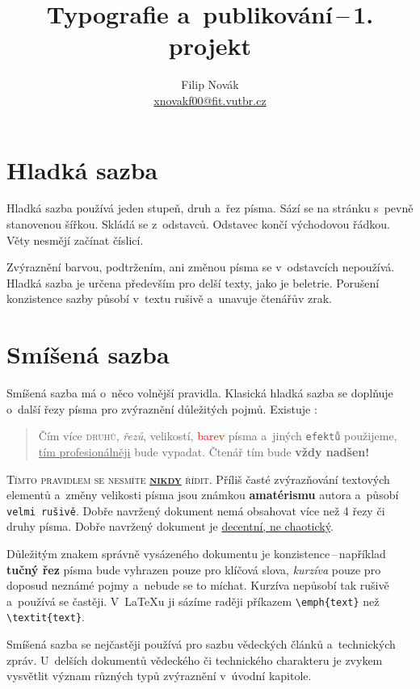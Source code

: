 \documentclass[twocolumn, a4paper]{article}
\title{Typografie a~publikování\,--\,1. projekt}
\date{}
\author{Filip Novák\\ \href{mailto: xnovakf00@fit.vutbr.cz}{xnovakf00@fit.vutbr.cz}}
\begin{document}
\maketitle

\section{\textbf{Hladká sazba}}
Hladká sazba používá jeden stupeň, druh a~řez písma.
Sází se na stránku s~pevně stanovenou šířkou.
Skládá se z~odstavců. Odstavec končí východovou řádkou.
Věty nesmějí začínat číslicí.

Zvýraznění barvou, podtržením, ani změnou písma se v~odstavcích nepoužívá.
Hladká sazba je určena především pro delší texty, jako je beletrie.
Porušení konzistence sazby působí v~textu rušivě a~unavuje čtenářův zrak.

\section{\textbf{Smíšená sazba}}\label{2}
Smíšená sazba má o~něco volnější pravidla.
Klasická hladká sazba se doplňuje o~další řezy písma pro zvýraznění důležitých pojmů.
Existuje :
\begin{quotation}
Čím více \textsc{druhů}, \emph{řezů}, {\scriptsize velikostí}, \textcolor{red}{barev} písma a~jiných \texttt{efektů} použijeme, \underline{tím profesionálněji} bude {\selectfont{dokument}} vypadat.
Čtenář tím bude \textbf{\LARGE{vždy nadšen!}}
\end{quotation}

\textsc{Tímto pravidlem se nesmíte \textbf{\underline{nikdy}} řídit.}
Příliš časté zvýrazňování textových elementů a~změny {\tiny velikosti} písma jsou známkou \textbf{amatérismu} autora a~působí \texttt{velmi rušivě}.
Dobře navržený dokument nemá obsahovat více než 4 řezy či druhy písma.
Dobře navržený dokument je \underline{decentní, ne chaotický}.

Důležitým znakem správně vysázeného dokumentu je konzistence\,--\,například \textbf{tučný řez} písma bude vyhrazen pouze pro klíčová slova, \emph{kurzíva} pouze pro doposud neznámé pojmy a~nebude se to míchat.
Kurzíva nepůsobí tak rušivě a~používá se častěji.
V~\LaTeX u ji sázíme raději příkazem \verb|\emph{text}| než \verb|\textit{text}|.

Smíšená sazba se nejčastěji používá pro sazbu vědeckých článků a~technických zpráv.
U~delších dokumentů vědeckého či technického charakteru je zvykem vysvětlit význam různých typů zvýraznění v~úvodní kapitole.
\end{document}
